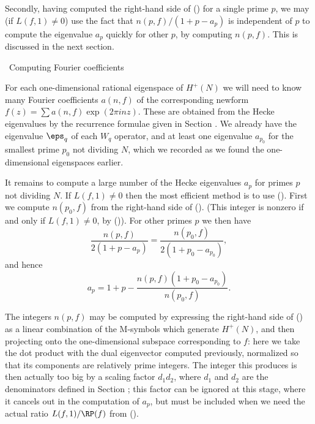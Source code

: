 Secondly, having computed the right-hand side of (\maninratio) for a single 
prime $p$, we may (if $L(f,1)\not=0$) use the fact that $n(p,f)/(1+p-a_p)$ 
is independent of $p$ to compute the eigenvalue $a_p$ quickly for other 
$p$, by computing $n(p,f)$.   This is discussed in the next section.

%
%
\beginsection{\Ap}
\head \sec\ Computing Fourier coefficients \endhead

For each one-dimensional rational eigenspace of $H^+(N)$ we will need to
know many Fourier coefficients $a(n,f)$ of the corresponding newform
$f(z)=\sum a(n,f)\exp(2\pi inz)$.   These are obtained from the Hecke
eigenvalues by the recurrence formulae given in Section \Mcurves.
We already have the eigenvalue $\eps_q$ of each $W_q$ operator,
and at least one eigenvalue $a_{p_0}$ for the smallest prime $p_0$ not
dividing $N$, which we recorded as we found the one-dimensional 
eigen\-spaces earlier.

It remains to compute a large number of the Hecke eigenvalues $a_p$ for
primes $p$ not dividing $N$.   
If $L(f,1)\not=0$ then the most efficient method is to use
(\maninratio). 
First we compute $n(p_0,f)$ from the right-hand side of (\manina).
(This integer is nonzero if and only if $L(f,1)\not=0$, by (\maninratio)).
For other primes $p$ we then have
$$
   \frac{n(p,f)}{2(1+p-a_p)} = \frac{n(p_0,f)}{2(1+p_0-a_{p_0})},
$$
and hence
$$
   a_p = 1+p-\frac{n(p,f)(1+p_0-a_{p_0})}{n(p_0,f)}.
$$

The integers $n(p,f)$ may be computed by expressing the right-hand side of
(\manina) as a linear combination of the M-symbols which generate $H^+(N)$,
and then projecting onto the one-dimensional subspace corresponding to $f$:
here we take the dot product with the dual eigenvector computed previously,
normalized so that its components are relatively prime integers.  The
integer this produces is then actually too big by a scaling factor $d_1d_2$, 
where $d_1$ and $d_2$ are
the denominators defined in Section \Msymb; this factor can be 
ignored at this stage, where it cancels out in the computation of $a_p$,
but must be included when we need the actual ratio $L(f,1)/\RP(f)$
from (\maninratio).

